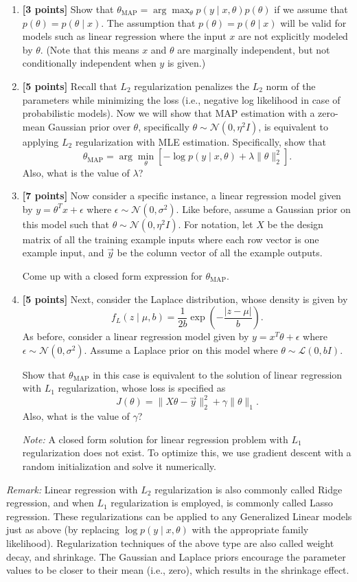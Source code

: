 \documentclass[11pt]{article}
\begin{document}
\begin{enumerate}
\item \textbf{[3 points]} Show that $\theta_{\mathrm{MAP}}=\arg\max_\theta p(y\mid x,\theta)p(\theta)$ if we assume that $p(\theta)=p(\theta\mid x)$. The assumption that $p(\theta)=p(\theta\mid x)$ will be valid for models such as linear regression where the input $x$ are not explicitly modeled by $\theta$. (Note that this means $x$ and $\theta$ are marginally independent, but not conditionally independent when $y$ is given.)
\item \textbf{[5 points]} Recall that $L_2$ regularization penalizes the $L_2$ norm of the parameters while minimizing the loss (i.e., negative log likelihood in case of probabilistic models). Now we will show that MAP estimation with a zero-mean Gaussian prior over $\theta$, specifically $\theta\sim\mathcal{N}(0,\eta^2I)$, is equivalent to applying $L_2$ regularization with MLE estimation. Specifically, show that
\[\theta_{\mathrm{MAP}}=\arg\min_\theta\left[-\log p(y\mid x,\theta)+\lambda\|\theta\|_2^2\right].\]
Also, what is the value of $\lambda$?
\item \textbf{[7 points]} Now consider a specific instance, a linear regression model given by $y=\theta^Tx+\epsilon$ where $\epsilon\sim\mathcal{N}(0,\sigma^2)$. Like before, assume a Gaussian prior on this model such that $\theta\sim\mathcal{N}(0,\eta^2I)$. For notation, let $X$ be the design matrix of all the training example inputs where each row vector is one example input, and $\vec{y}$ be the column vector of all the example outputs.

Come up with a closed form expression for $\theta_{\mathrm{MAP}}$.
\item \textbf{[5 points]} Next, consider the Laplace distribution, whose density is given by
\[f_L(z\mid\mu,b)=\frac{1}{2b}\exp\left(-\frac{|z-\mu|}{b}\right).\]
As before, consider a linear regression model given by $y=x^T\theta+\epsilon$ where $\epsilon\sim\mathcal{N}(0,\sigma^2)$. Assume a Laplace prior on this model where $\theta\sim\mathcal{L}(0,bI)$.

Show that $\theta_{\mathrm{MAP}}$ in this case is equivalent to the solution of linear regression with $L_1$ regularization, whose loss is specified as
\[J(\theta)=\|X\theta-\vec{y}\|_2^2+\gamma\|\theta\|_1.\]
Also, what is the value of $\gamma$?

\textit{Note:} A closed form solution for linear regression problem with $L_1$ regularization does not exist. To optimize this, we use gradient descent with a random initialization and solve it numerically.
\end{enumerate}
\textit{Remark:} Linear regression with $L_2$ regularization is also commonly called Ridge regression, and when $L_1$ regularization is employed, is commonly called Lasso regression. These regularizations can be applied to any Generalized Linear models just as above (by replacing $\log p(y\mid x,\theta)$ with the appropriate family likelihood). Regularization techniques of the above type are also called weight decay, and shrinkage. The Gaussian and Laplace priors encourage the parameter values to be closer to their mean (i.e., zero), which results in the shrinkage effect.
\end{document}

